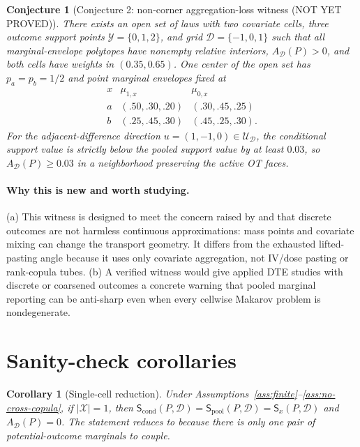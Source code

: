 \documentclass[11pt]{article}
\theoremstyle{definition}
\theoremstyle{plain}
\newtheorem{conjecture}{Conjecture}
\newtheorem{corollary}{Corollary}
\theoremstyle{remark}
\begin{document}
\begin{conjecture}[Conjecture 2: non-corner aggregation-loss witness (NOT YET PROVED)]\label{conj:witness}
There exists an open set of laws with two covariate cells, three outcome support points \(\mathcal Y=\{0,1,2\}\), and grid \(\mathcal D=\{-1,0,1\}\) such that all marginal-envelope polytopes have nonempty relative interiors, \(A_{\mathcal D}(P)>0\), and both cells have weights in \((0.35,0.65)\).  One center of the open set has \(p_a=p_b=1/2\) and point marginal envelopes fixed at
\[
\begin{array}{c|cc}
x & \mu_{1,x} & \mu_{0,x}\\ \hline
a & (.50,.30,.20) & (.30,.45,.25)\\
b & (.25,.45,.30) & (.45,.25,.30).
\end{array}
\]
For the adjacent-difference direction \(u=(1,-1,0)\in\mathcal U_{\mathcal D}\), the conditional support value is strictly below the pooled support value by at least \(0.03\), so \(A_{\mathcal D}(P)\ge0.03\) in a neighborhood preserving the active OT faces.
\end{conjecture}
\paragraph{Why this is new and worth studying.}
(a) This witness is designed to meet the concern raised by \citet{Mullahy2023} and \citet{LuDingDasgupta2018} that discrete outcomes are not harmless continuous approximations: mass points and covariate mixing can change the transport geometry.  It differs from the exhausted lifted-pasting angle because it uses only covariate aggregation, not IV/dose pasting or rank-copula tubes.  (b) A verified witness would give applied DTE studies with discrete or coarsened outcomes a concrete warning that pooled marginal reporting can be anti-sharp even when every cellwise Makarov problem is nondegenerate.

\section{Sanity-check corollaries}
\begin{corollary}[Single-cell reduction]\label{cor:single-cell}
Under Assumptions~\ref{ass:finite}--\ref{ass:no-cross-copula}, if \(|\mathcal X|=1\), then \(\mathsf S_{\mathrm{cond}}(P,\mathcal D)=\mathsf S_{\mathrm{pool}}(P,\mathcal D)=\mathsf S_x(P,\mathcal D)\) and \(A_{\mathcal D}(P)=0\).  The statement reduces to \citet[Section 2]{FanPark2010} because there is only one pair of potential-outcome marginals to couple.
\end{corollary}
\end{document}
